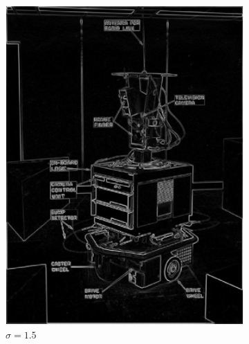 \documentclass[lettersize,journal]{IEEEtran}
\begin{document}
\begin{figure}[h]
\begin{subfigure}[h]{0.115\textwidth}
        \includegraphics[width=\linewidth]{gaussian_edge_map_5x5_sigma_1.5}
        \caption{$\sigma=1.5$}  
    \end{subfigure}
    \begin{subfigure}[h]{0.115\textwidth}
        \centering

\end{subfigure}
\end{figure}
\end{document}
